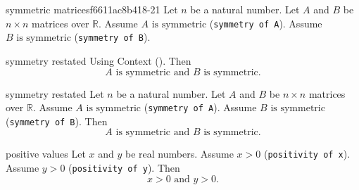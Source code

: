 \ifcleanreferenced
\begin{cleancontext}{symmetric matrices}{f6611ac8b418-21}
Let $n$ be a natural number.
Let $A$ and $B$ be $n\times n$ matrices over $\mathbb{R}$.
Assume $A\text{ is symmetric}$ (\texttt{symmetry of A}).
Assume $B\text{ is symmetric}$ (\texttt{symmetry of B}).
\end{cleancontext}
\begin{cleanresult}{symmetry restated}
Using Context ().
Then \[A\text{ is symmetric} \text{ and } B\text{ is symmetric}.\]
\end{cleanresult}

\else
\begin{cleanresult}{symmetry restated}
Let $n$ be a natural number.
Let $A$ and $B$ be $n\times n$ matrices over $\mathbb{R}$.
Assume $A\text{ is symmetric}$ (\texttt{symmetry of A}).
Assume $B\text{ is symmetric}$ (\texttt{symmetry of B}).
Then \[A\text{ is symmetric} \text{ and } B\text{ is symmetric}.\]
\end{cleanresult}

\fi
\begin{cleanresult}{positive values}
Let $x$ and $y$ be real numbers.
Assume $x > 0$ (\texttt{positivity of x}).
Assume $y > 0$ (\texttt{positivity of y}).
Then \[x > 0 \text{ and } y > 0.\]
\end{cleanresult}

